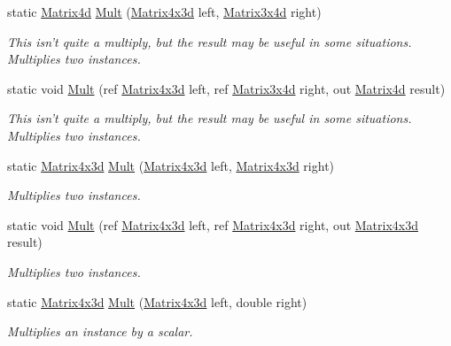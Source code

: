 \begin{DoxyCompactItemize}
static \hyperlink{struct_open_t_k_1_1_matrix4d}{Matrix4d} \hyperlink{struct_open_t_k_1_1_matrix4x3d_aa0a1a9ba812918845863142dd37f66cb}{Mult} (\hyperlink{struct_open_t_k_1_1_matrix4x3d}{Matrix4x3d} left, \hyperlink{struct_open_t_k_1_1_matrix3x4d}{Matrix3x4d} right)
\begin{DoxyCompactList}\small\item\em This isn't quite a multiply, but the result may be useful in some situations. Multiplies two instances. \end{DoxyCompactList}\item 
static void \hyperlink{struct_open_t_k_1_1_matrix4x3d_a280893b69554f6256108d21e39ae5287}{Mult} (ref \hyperlink{struct_open_t_k_1_1_matrix4x3d}{Matrix4x3d} left, ref \hyperlink{struct_open_t_k_1_1_matrix3x4d}{Matrix3x4d} right, out \hyperlink{struct_open_t_k_1_1_matrix4d}{Matrix4d} result)
\begin{DoxyCompactList}\small\item\em This isn't quite a multiply, but the result may be useful in some situations. Multiplies two instances. \end{DoxyCompactList}\item 
static \hyperlink{struct_open_t_k_1_1_matrix4x3d}{Matrix4x3d} \hyperlink{struct_open_t_k_1_1_matrix4x3d_a0ffcdcd09df2b6030dd4a9b52eff9806}{Mult} (\hyperlink{struct_open_t_k_1_1_matrix4x3d}{Matrix4x3d} left, \hyperlink{struct_open_t_k_1_1_matrix4x3d}{Matrix4x3d} right)
\begin{DoxyCompactList}\small\item\em Multiplies two instances. \end{DoxyCompactList}\item 
static void \hyperlink{struct_open_t_k_1_1_matrix4x3d_ae0b4aceda0cf27b1ffd79ce7a740b7a0}{Mult} (ref \hyperlink{struct_open_t_k_1_1_matrix4x3d}{Matrix4x3d} left, ref \hyperlink{struct_open_t_k_1_1_matrix4x3d}{Matrix4x3d} right, out \hyperlink{struct_open_t_k_1_1_matrix4x3d}{Matrix4x3d} result)
\begin{DoxyCompactList}\small\item\em Multiplies two instances. \end{DoxyCompactList}\item 
static \hyperlink{struct_open_t_k_1_1_matrix4x3d}{Matrix4x3d} \hyperlink{struct_open_t_k_1_1_matrix4x3d_add119f3d87180a5ed1c01a180168a9bd}{Mult} (\hyperlink{struct_open_t_k_1_1_matrix4x3d}{Matrix4x3d} left, double right)
\begin{DoxyCompactList}\small\item\em Multiplies an instance by a scalar. \end{DoxyCompactList}\item 

\end{DoxyCompactItemize}
